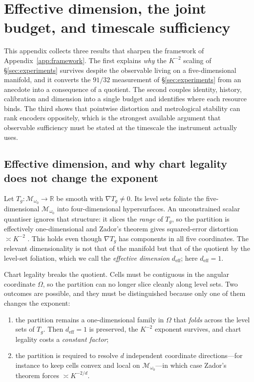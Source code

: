 \documentclass[11pt]{article}
\newcommand{\Mopt}{\mathcal{M}_{\omega_0}}
\begin{document}
\section{Effective dimension, the joint budget, and timescale sufficiency}\label{app:joint}

This appendix collects three results that sharpen the framework of
Appendix~\ref{app:framework}. The first explains \emph{why} the $K^{-2}$ scaling of
\S\ref{sec:experiments} survives despite the observable living on a five-dimensional
manifold, and it converts the $91/32$ measurement of \S\ref{sec:experiments} from an
anecdote into a consequence of a quotient. The second couples identity, history,
calibration and dimension into a single budget and identifies where each resource binds.
The third shows that pointwise distortion and metrological stability can rank encoders
oppositely, which is the strongest available argument that observable sufficiency must be
stated at the timescale the instrument actually uses.

\subsection{Effective dimension, and why chart legality does not change the exponent}

Let $T_g:\Mopt\to\mathbb{R}$ be smooth with $\nabla T_g\neq 0$. Its level sets foliate the
five-dimensional $\Mopt$ into four-dimensional hypersurfaces. An unconstrained scalar
quantiser ignores that structure: it slices the \emph{range} of $T_g$, so the partition is
effectively one-dimensional and Zador's theorem gives squared-error distortion
$\asymp K^{-2}$ \cite{zador1982,gray1998}. This holds even though $\nabla T_g$ has
components in all five coordinates. The relevant dimensionality is not that of the
manifold but that of the quotient by the level-set foliation, which we call the
\emph{effective dimension} $d_{\mathrm{eff}}$; here $d_{\mathrm{eff}}=1$.

Chart legality breaks the quotient. Cells must be contiguous in the angular coordinate
$\Omega$, so the partition can no longer slice cleanly along level sets. Two outcomes are
possible, and they must be distinguished because only one of them changes the exponent:

\begin{enumerate}[label=(\roman*)]
\item the partition remains a one-dimensional family in $\Omega$ that \emph{folds} across
  the level sets of $T_g$. Then $d_{\mathrm{eff}}=1$ is preserved, the $K^{-2}$ exponent
  survives, and chart legality costs a \emph{constant factor};
\item the partition is required to resolve $d$ independent coordinate directions---for
  instance to keep cells convex and local on $\Mopt$---in which case Zador's theorem
  forces $\asymp K^{-2/d}$.
\end{enumerate}
\end{document}
